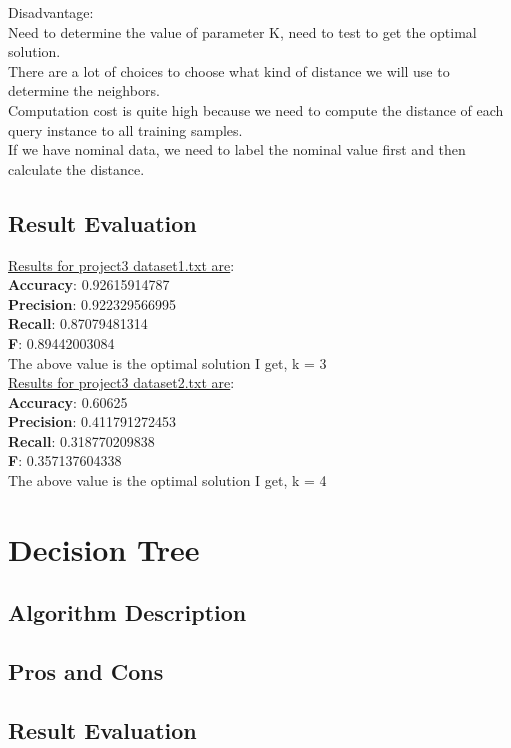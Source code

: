 \documentclass[paper=letter, fontsize=11pt]{article}
\numberwithin{equation}{section}		%
\numberwithin{figure}{section}			%
\numberwithin{table}{section}				%
\begin{document}
\noindent Disadvantage:\\
Need to determine the value of parameter K, need to test to get the optimal solution.\\
There are a lot of choices to choose what kind of distance we will use to determine the neighbors.\\
Computation cost is quite high because we need to compute the distance of each query instance to all training samples.\\
If we have nominal data, we need to label the nominal value first and then calculate the distance.\\
\subsection{Result Evaluation}
\noindent \underline{Results for project3 dataset1.txt are}: \\ 
\textbf{Accuracy}: 0.92615914787\\
\textbf{Precision}: 0.922329566995\\
\textbf{Recall}: 0.87079481314\\
\textbf{F}: 0.89442003084\\

\noindent The above value is the optimal solution I get, k = 3\\

\noindent \underline{Results for project3 dataset2.txt are}:\\
\textbf{Accuracy}: 0.60625\\
\textbf{Precision}: 0.411791272453\\
\textbf{Recall}: 0.318770209838\\
\textbf{F}: 0.357137604338\\

\noindent The above value is the optimal solution I get, k = 4
\section{Decision Tree}
\subsection{Algorithm Description}

\subsection{Pros and Cons}

\subsection{Result Evaluation}
\end{document}
